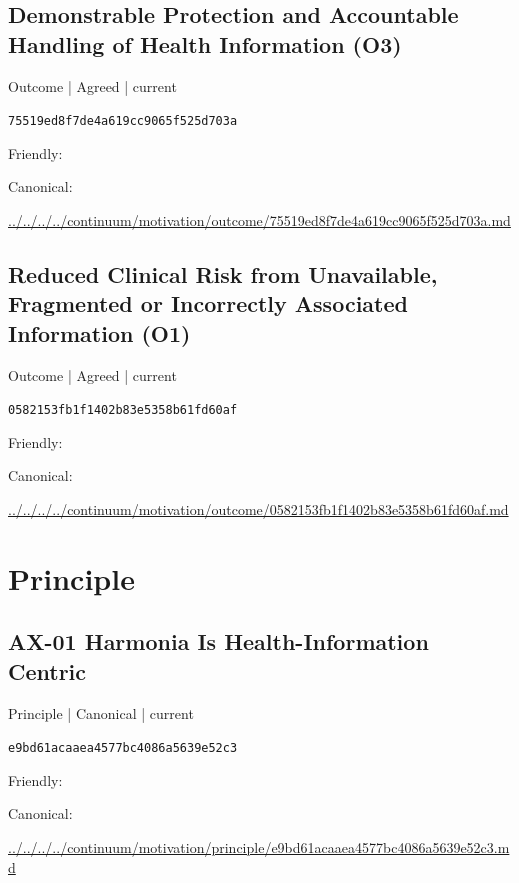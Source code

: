 \documentclass[10pt,a4paper]{article}
\begin{document}
\subsection*{Demonstrable Protection and Accountable Handling of Health Information (O3)}
{\small Outcome | Agreed | current}\par
\texttt{75519ed8f7de4a619cc9065f525d703a}\par
Friendly: \par
Canonical: \par
{\footnotesize\url{../../../../continuum/motivation/outcome/75519ed8f7de4a619cc9065f525d703a.md}}\par
\subsection*{Reduced Clinical Risk from Unavailable, Fragmented or Incorrectly Associated Information (O1)}
{\small Outcome | Agreed | current}\par
\texttt{0582153fb1f1402b83e5358b61fd60af}\par
Friendly: \par
Canonical: \par
{\footnotesize\url{../../../../continuum/motivation/outcome/0582153fb1f1402b83e5358b61fd60af.md}}\par
\section*{Principle}
\subsection*{AX-01 Harmonia Is Health-Information Centric}
{\small Principle | Canonical | current}\par
\texttt{e9bd61acaaea4577bc4086a5639e52c3}\par
Friendly: \par
Canonical: \par
{\footnotesize\url{../../../../continuum/motivation/principle/e9bd61acaaea4577bc4086a5639e52c3.md}}\par
\end{document}
